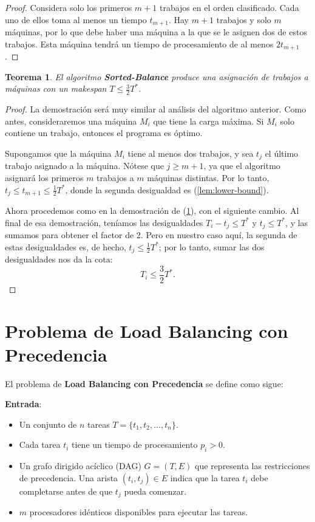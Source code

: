 \documentclass{report}
\newtheorem{theorem}{Teorema} %
\begin{document}
	\begin{proof}
		Considera solo los primeros \( m + 1 \) trabajos en el orden clasificado. Cada uno de ellos toma al menos un tiempo \( t_{m+1} \). Hay \( m + 1 \) trabajos y solo \( m \) máquinas, por lo que debe haber una máquina a la que se le asignen dos de estos trabajos. Esta máquina tendrá un tiempo de procesamiento de al menos \( 2t_{m+1} \).
	\end{proof}
	
	\begin{theorem} \label{thm:sorted-balance}
		El algoritmo \textbf{Sorted-Balance} produce una asignación de trabajos a máquinas con un makespan \( T \leq \frac{3}{2} T^* \).
	\end{theorem}
	
	\begin{proof}
		La demostración será muy similar al análisis del algoritmo anterior. Como antes, consideraremos una máquina \( M_i \) que tiene la carga máxima. Si \( M_i \) solo contiene un trabajo, entonces el programa es óptimo.
		
		Supongamos que la máquina \( M_i \) tiene al menos dos trabajos, y sea \( t_j \) el último trabajo asignado a la máquina. Nótese que \( j \geq m + 1 \), ya que el algoritmo asignará los primeros \( m \) trabajos a \( m \) máquinas distintas. Por lo tanto, \( t_j \leq t_{m+1} \leq \frac{1}{2} T^* \), donde la segunda desigualdad es (\ref{lem:lower-bound}).
		
		Ahora procedemos como en la demostración de (\ref{thm:sorted-balance}), con el siguiente cambio. Al final de esa demostración, teníamos las desigualdades \( T_i - t_j \leq T^* \) y \( t_j \leq T^* \), y las sumamos para obtener el factor de 2. Pero en nuestro caso aquí, la segunda de estas desigualdades es, de hecho, \( t_j \leq \frac{1}{2} T^* \); por lo tanto, sumar las dos desigualdades nos da la cota:
		\[
		T_i \leq \frac{3}{2} T^*.
		\]
	\end{proof}
	
	
	
	\section{Problema de Load Balancing con Precedencia}
	
	El problema de \textbf{Load Balancing con Precedencia} se define como sigue:
	
	\textbf{Entrada}:
	\begin{itemize}
		\item Un conjunto de $ n $ tareas $ T = \{t_1, t_2, \dots, t_n\} $.
		\item Cada tarea $ t_i $ tiene un tiempo de procesamiento $ p_i > 0 $.
		\item Un grafo dirigido acíclico (DAG) $ G = (T, E) $ que representa las restricciones de precedencia. Una arista $ (t_i, t_j) \in E $ indica que la tarea $ t_i $ debe completarse antes de que $ t_j $ pueda comenzar.
		\item $ m $ procesadores idénticos disponibles para ejecutar las tareas.
	\end{itemize}
	
\end{document}
